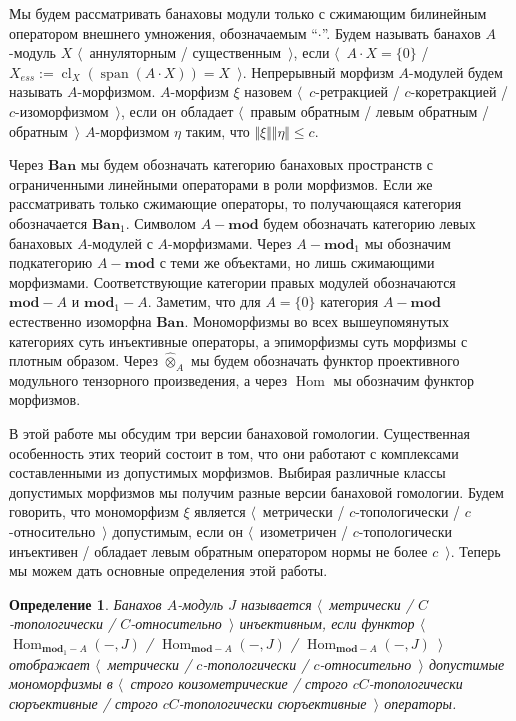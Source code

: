 \documentclass[12pt]{article}
\newtheorem{definition}[theorem]{Определение}
\newcommand{\projtens}{\mathbin{\widehat{\otimes}}}
\begin{document}
Мы будем рассматривать банаховы модули только с сжимающим билинейным оператором внешнего умножения, обозначаемым ``$\cdot$''. Будем называть банахов $A$-модуль $X$ $\langle$~аннуляторным / существенным~$\rangle$, если $\langle$~$A\cdot X=\{0\}$ / $X_{ess}:=\operatorname{cl}_X(\operatorname{span}(A\cdot X))=X$~$\rangle$. Непрерывный морфизм $A$-модулей будем называть $A$-морфизмом. $A$-морфизм $\xi$ назовем $\langle$~$c$-ретракцией / $c$-коретракцией / $c$-изоморфизмом~$\rangle$, если он обладает $\langle$~правым обратным / левым обратным / обратным~$\rangle$ $A$-морфизмом $\eta$ таким, что $\Vert\xi\Vert\Vert\eta\Vert\leq c$. 

Через $\mathbf{Ban}$ мы будем обозначать категорию банаховых пространств с ограниченными линейными операторами в роли морфизмов. Если же рассматривать только сжимающие операторы, то получающаяся категория обозначается $\mathbf{Ban}_1$. Символом $A-\mathbf{mod}$ будем обозначать категорию левых банаховых $A$-модулей с $A$-морфизмами. Через $A-\mathbf{mod}_1$ мы обозначим подкатегорию $A-\mathbf{mod}$ с теми же объектами, но лишь сжимающими морфизмами. Соответствующие категории правых модулей обозначаются $\mathbf{mod}-A$ и $\mathbf{mod}_1-A$. Заметим, что для $A=\{0\}$ категория $A-\mathbf{mod}$ естественно изоморфна $\mathbf{Ban}$. Мономорфизмы во всех вышеупомянутых категориях суть инъективные операторы, а эпиморфизмы суть морфизмы с плотным образом. Через $\projtens_A$ мы будем обозначать функтор проективного модульного тензорного произведения, а через $\operatorname{Hom}$ мы обозначим функтор морфизмов.

В этой работе мы обсудим три версии банаховой гомологии. Существенная особенность этих теорий состоит в том, что они работают с комплексами составленными из допустимых морфизмов. Выбирая различные классы допустимых морфизмов мы получим разные версии банаховой гомологии. Будем говорить, что мономорфизм $\xi$ является $\langle$~метрически / $c$-топологически / $c$-относительно~$\rangle$ допустимым, если он $\langle$~изометричен / $c$-топологически инъективен / обладает левым обратным оператором нормы не более $c$~$\rangle$. Теперь мы можем дать основные определения этой работы. 

\begin{definition} Банахов $A$-модуль $J$ называется \emph{$\langle$~метрически / $C$-топологически / $C$-относительно~$\rangle$ инъективным}, если функтор $\langle$~$\operatorname{Hom}_{\mathbf{mod}_1-A}(-,J)$ / $\operatorname{Hom}_{\mathbf{mod}-A}(-,J)$ / $\operatorname{Hom}_{\mathbf{mod}-A}(-,J)$~$\rangle$ отображает $\langle$~метрически / $c$-топологически / $c$-относительно~$\rangle$ допустимые мономорфизмы в $\langle$~строго коизометрические / строго $cC$-топологически сюръективные / строго $cC$-топологически сюръективные~$\rangle$ операторы.
\end{definition}
\end{document}
